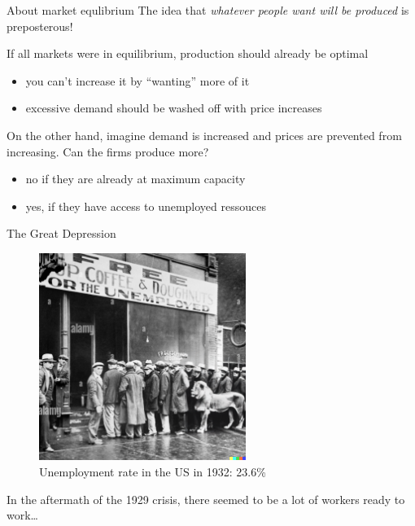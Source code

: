 \begin{frame}{About market equlibrium}
\protect\hypertarget{about-market-equlibrium}{}
The idea that \emph{whatever people want will be produced} is
preposterous!

\pause

If all markets were in equilibrium, production should already be optimal

\begin{itemize}
\tightlist
\item
  you can't increase it by ``wanting'' more of it
\item
  excessive demand should be washed off with price increases
\end{itemize}

\pause

On the other hand, imagine demand is increased and prices are prevented
from increasing. Can the firms produce more?

\begin{itemize}
\tightlist
\item
  no if they are already at maximum capacity

\item
  yes, if they have access to unemployed ressouces
\end{itemize}
\end{frame}

\begin{frame}{The Great Depression}
\protect\hypertarget{the-great-depression}{}
\begin{figure}
\centering
\includegraphics[width=0.6\textwidth,height=\textheight]{assets/hungry_lion.png}
\caption{Unemployment rate in the US in 1932: 23.6\%}
\end{figure}

In the aftermath of the 1929 crisis, there seemed to be a lot of workers
ready to work\ldots{}
\end{frame}

